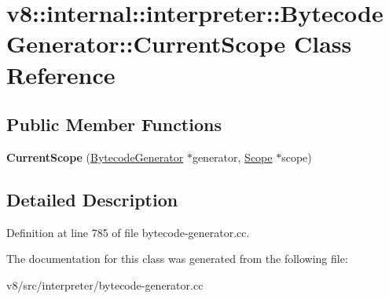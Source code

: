 \hypertarget{classv8_1_1internal_1_1interpreter_1_1BytecodeGenerator_1_1CurrentScope}{}\section{v8\+:\+:internal\+:\+:interpreter\+:\+:Bytecode\+Generator\+:\+:Current\+Scope Class Reference}
\label{classv8_1_1internal_1_1interpreter_1_1BytecodeGenerator_1_1CurrentScope}
\subsection*{Public Member Functions}
\begin{DoxyCompactItemize}
\item 
\mbox{\label{classv8_1_1internal_1_1interpreter_1_1BytecodeGenerator_1_1CurrentScope_abaf2303101b48636140c8b472339f0e2}} 
{\bfseries Current\+Scope} (\mbox{\hyperlink{classv8_1_1internal_1_1interpreter_1_1BytecodeGenerator}{Bytecode\+Generator}} $\ast$generator, \mbox{\hyperlink{classv8_1_1internal_1_1Scope}{Scope}} $\ast$scope)
\end{DoxyCompactItemize}


\subsection{Detailed Description}


Definition at line 785 of file bytecode-\/generator.\+cc.



The documentation for this class was generated from the following file\+:\begin{DoxyCompactItemize}
\item 
v8/src/interpreter/bytecode-\/generator.\+cc\end{DoxyCompactItemize}
